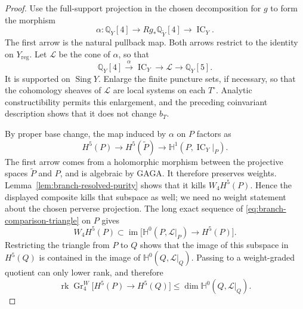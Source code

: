 \documentclass[11pt]{amsart}
\theoremstyle{definition}
\theoremstyle{remark}
\numberwithin{equation}{section}
\newcommand{\Q}{\mathbb{Q}}
\DeclareMathOperator{\Sing}{Sing}
\DeclareMathOperator{\rk}{rk}
\DeclareMathOperator{\im}{im}
\DeclareMathOperator{\IC}{IC}
\DeclareMathOperator{\Gr}{Gr}
\begin{document}
\begin{proof}
Use the full-support projection in the chosen decomposition for $g$
to form the morphism
\[
 \alpha\colon\Q_Y[4]\longrightarrow Rg_*\Q_{\widetilde Y}[4]
                                      \longrightarrow\IC_Y.
\]
The first arrow is the natural pullback map.  Both arrows restrict
to the identity on $Y_{\mathrm{reg}}$.  Let $\mathcal L$ be the cone
of $\alpha$, so that
\begin{equation}\label{eq:branch-comparison-triangle}
 \Q_Y[4]\xrightarrow{\alpha}\IC_Y\longrightarrow\mathcal L
                                      \longrightarrow\Q_Y[5].
\end{equation}
It is supported on $\Sing Y$.
Enlarge the finite puncture sets, if necessary, so that the cohomology
sheaves of $\mathcal L$ are local systems on each $T^\circ$.  Analytic
constructibility permits this enlargement, and the preceding
coinvariant description shows that it does not change $b_T$.

By proper base change, the map induced by $\alpha$ on $P$ factors as
\[
 H^5(P)\longrightarrow H^5(\widetilde P)
           \longrightarrow\mathbb H^1(P,\IC_Y|_P).
\]
The first arrow comes from a holomorphic morphism between the
projective spaces $\widetilde P$ and $P$, and is algebraic by GAGA.
It therefore preserves weights.  Lemma~\ref{lem:branch-resolved-purity}
shows that it kills $W_4H^5(P)$.  Hence the displayed composite kills
that subspace as well; we need no weight statement about the chosen
perverse projection.  The long exact sequence of
\eqref{eq:branch-comparison-triangle} on $P$ gives
\[
 W_4H^5(P)\subset
 \im\bigl[\mathbb H^0(P,\mathcal L|_P)\longrightarrow H^5(P)\bigr].
\]
Restricting the triangle from $P$ to $Q$ shows that the image of this
subspace in $H^5(Q)$ is contained in the image of
$\mathbb H^0(Q,\mathcal L|_Q)$.  Passing to a weight-graded quotient
can only lower rank, and therefore
\begin{equation}\label{eq:branch-cone-rank}
 \rk\Gr^W_4\bigl[H^5(P)\longrightarrow H^5(Q)\bigr]
        \leq\dim\mathbb H^0(Q,\mathcal L|_Q).
\end{equation}


\end{proof}
\end{document}
